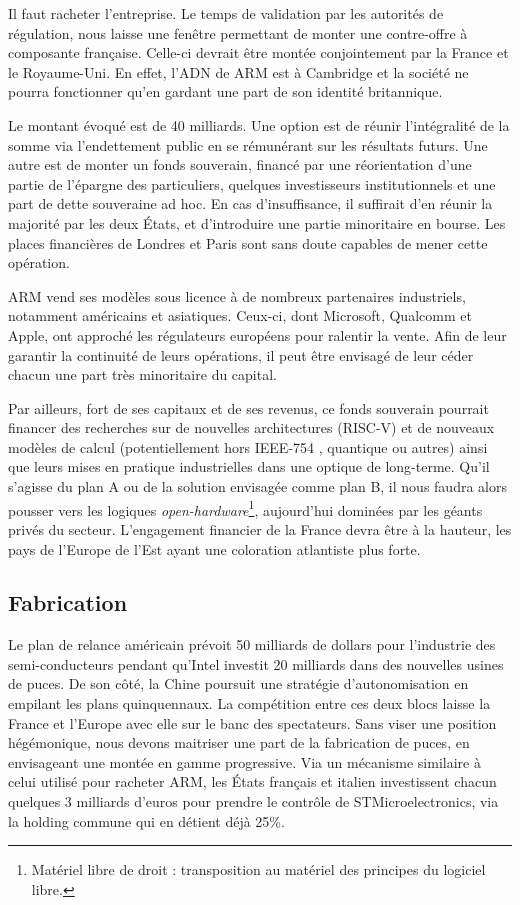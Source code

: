 \documentclass[a4paper]{article}
\begin{document}
Il faut racheter l’entreprise. Le temps de validation par les autorités de régulation, nous laisse une fenêtre permettant de monter une contre-offre à composante française. Celle-ci devrait être montée conjointement par la France et le Royaume-Uni. En effet, l’ADN de ARM est à Cambridge et la société ne pourra fonctionner qu’en gardant une part de son identité britannique. 

Le montant évoqué est de 40 milliards. Une option est de réunir l’intégralité de la somme via l’endettement public en se rémunérant sur les résultats futurs. Une autre est de monter un fonds souverain, financé par une réorientation d’une partie de l’épargne des particuliers, quelques investisseurs institutionnels et une part de dette souveraine ad hoc. En cas d’insuffisance, il suffirait d’en réunir la majorité par les deux États, et d’introduire une partie minoritaire en bourse. Les places financières de Londres et Paris sont sans doute capables de mener cette opération. 

ARM vend ses modèles sous licence à de nombreux partenaires industriels, notamment américains et asiatiques. Ceux-ci, dont Microsoft, Qualcomm et Apple, ont approché les régulateurs européens pour ralentir la vente. Afin de leur garantir la continuité de leurs opérations, il peut être envisagé de leur céder chacun une part très minoritaire du capital.

Par ailleurs, fort de ses capitaux et de ses revenus, ce fonds souverain pourrait financer des recherches sur de nouvelles architectures (RISC-V) et de nouveaux modèles de calcul (potentiellement hors IEEE-754 \cite{hunhold2017unum}, quantique ou autres) ainsi que leurs mises en pratique industrielles dans une optique de long-terme. Qu’il s’agisse du plan A ou de la solution envisagée comme plan B, il nous faudra alors pousser vers les logiques \textit{open-hardware}\footnote{Matériel libre de droit : transposition au matériel des principes du logiciel libre.}, aujourd’hui dominées par les géants privés du secteur. L’engagement financier de la France devra être à la hauteur, les pays de l’Europe de l’Est ayant une coloration atlantiste plus forte. 

\subsection{Fabrication}
Le plan de relance américain prévoit 50 milliards de dollars pour l’industrie des semi-conducteurs  pendant qu’Intel investit 20 milliards dans des nouvelles usines de puces. De son côté, la Chine poursuit une stratégie d’autonomisation en empilant les plans quinquennaux. La compétition entre ces deux blocs laisse la France et l’Europe avec elle sur le banc des spectateurs. Sans viser une position hégémonique, nous devons maitriser une part de la fabrication de puces, en envisageant une montée en gamme progressive. 
Via un mécanisme similaire à celui utilisé pour racheter ARM, les États français et italien investissent chacun quelques 3 milliards d’euros pour prendre le contrôle de STMicroelectronics, via la holding commune qui en détient déjà 25\%. 
\end{document}
